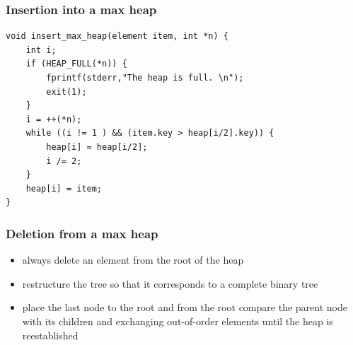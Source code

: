\documentclass[newPxFont,sthlmFooter,nooffset]{beamer}
\begin{document}
\begin{frame}[t, fragile]
  \frametitle{Insertion into a max heap}
  \begin{lstlisting}
void insert_max_heap(element item, int *n) { 
    int i;
    if (HEAP_FULL(*n)) {
        fprintf(stderr,"The heap is full. \n"); 
        exit(1);
    }
    i = ++(*n);
    while ((i != 1 ) && (item.key > heap[i/2].key)) {
        heap[i] = heap[i/2]; 
        i /= 2;
    }
    heap[i] = item;     
}
  \end{lstlisting}
\end{frame}


\begin{frame}[t]
  \frametitle{Deletion from a max heap}
  \begin{itemize}
  \item always delete an element from the root of the heap
  \item restructure the tree so that it corresponds to a complete binary tree
  \item place the last node to the root and from the root compare the parent node with its children and exchanging out-of-order elements until the heap is reestablished
  \end{itemize}
\end{frame}
\end{document}
